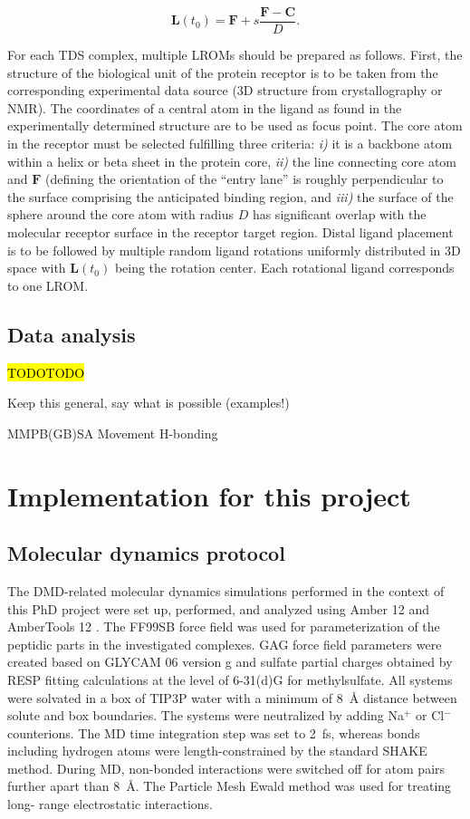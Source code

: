 \begin{equation}
\bm{L}(t_0) = \bm{F} + s \frac{\bm{F}-\bm{C}}{D}.
\end{equation}

For each TDS complex, multiple LROMs should be prepared as follows. First, the
structure of the biological unit of the protein receptor is to be taken from the
corresponding experimental data source (3D structure from crystallography or
NMR). The coordinates of a central atom in the ligand as found in the
experimentally determined structure are to be used as focus point. The core atom
in the receptor must be selected fulfilling three criteria: \textit{i)} it is a
backbone atom within a helix or beta sheet in the protein core, \textit{ii)} the
line connecting core atom and $\bm{F}$ (defining the orientation of the ``entry
lane'' is roughly perpendicular to the surface comprising the anticipated
binding region, and \textit{iii)} the surface of the sphere around the core atom
with radius $D$ has significant overlap with the molecular receptor surface in
the receptor target region. Distal ligand placement is to be followed by
multiple random ligand rotations uniformly distributed in 3D space with
$\bm{L}(t_0)$ being the rotation center. Each rotational ligand corresponds to
one LROM.

\subsection{Data analysis}
\hl{TODOTODO}

Keep this general, say what is possible (examples!)

            MMPB(GB)SA
            Movement
            H-bonding


\section{Implementation for this project}

\subsection{Molecular dynamics protocol}

The DMD-related molecular dynamics simulations performed in the context of this
PhD project were set up, performed, and analyzed using Amber 12 and AmberTools
12 \cite{case_amber_11}. The FF99SB force field was used for parameterization of
the peptidic parts in the investigated complexes. GAG force field parameters
were created based on GLYCAM 06 version g \cite{kirschner_glycam06:_2008} and
sulfate partial charges obtained by RESP fitting calculations at the level of
6-31(d)G for methylsulfate. All systems were solvated in a box of TIP3P water
with a minimum of \SI{8}{\angstrom} distance between solute and box boundaries.
The systems were neutralized by adding Na$^{+}$ or Cl$^{-}$ counterions. The MD
time integration step was set to \SI{2}{\femto\second}, whereas bonds including
hydrogen atoms were length-constrained by the standard SHAKE method. During MD,
non-bonded interactions were switched off for atom pairs further apart than
\SI{8}{\angstrom}. The Particle Mesh Ewald method was used for treating long-
range electrostatic interactions.

